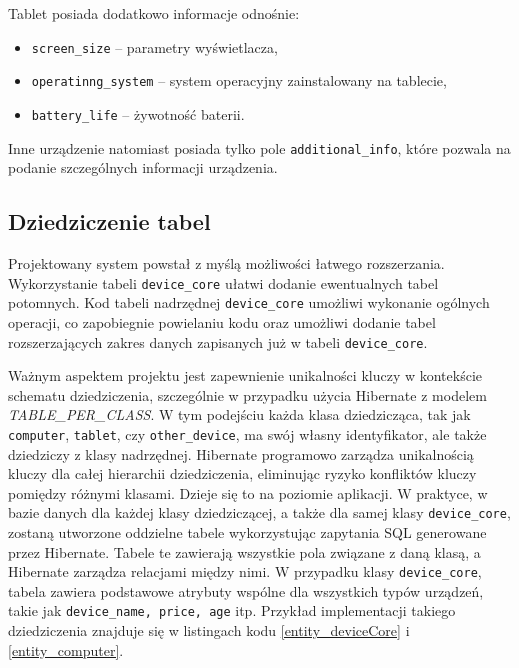 Tablet posiada dodatkowo informacje odnośnie:
\begin{itemize}
	\item \texttt{screen\_size} -- parametry wyświetlacza,
	\item \texttt{operatinng\_system} -- system operacyjny zainstalowany na tablecie,
	\item \texttt{battery\_life} -- żywotność baterii.
\end{itemize}
Inne urządzenie natomiast posiada tylko pole \texttt{additional\_info}, które pozwala na podanie szczególnych informacji urządzenia.

\subsection{Dziedziczenie tabel}
\label{dzedziczenie_hibernate:label}
Projektowany system powstał z myślą możliwości łatwego rozszerzania. Wykorzystanie tabeli \texttt{device\_core} ułatwi dodanie ewentualnych tabel potomnych. Kod tabeli nadrzędnej \texttt{device\_core} umożliwi wykonanie ogólnych operacji, co zapobiegnie powielaniu kodu oraz umożliwi dodanie tabel rozszerzających zakres danych zapisanych już w tabeli \texttt{device\_core}. 

Ważnym aspektem projektu jest zapewnienie unikalności kluczy w kontekście schematu dziedziczenia, szczególnie w przypadku użycia Hibernate z modelem \emph{TABLE\_PER\_CLASS}. W tym podejściu każda klasa dziedzicząca, tak jak \texttt{computer}, \texttt{tablet}, czy \texttt{other\_device}, ma swój własny identyfikator, ale także dziedziczy z klasy nadrzędnej. Hibernate programowo zarządza unikalnością kluczy dla całej hierarchii dziedziczenia, eliminując ryzyko konfliktów kluczy pomiędzy różnymi klasami. Dzieje się to na poziomie aplikacji. W praktyce, w bazie danych dla każdej klasy dziedziczącej, a także dla samej klasy \texttt{device\_core}, zostaną utworzone oddzielne tabele wykorzystując zapytania SQL generowane przez Hibernate. Tabele te zawierają wszystkie pola związane z daną klasą, a Hibernate zarządza relacjami między nimi. W przypadku klasy \texttt{device\_core}, tabela zawiera podstawowe atrybuty wspólne dla wszystkich typów urządzeń, takie jak \texttt{device\_name, price, age} itp. Przykład implementacji takiego dziedziczenia znajduje się w listingach kodu \ref{entity_deviceCore} i \ref{entity_computer}.

